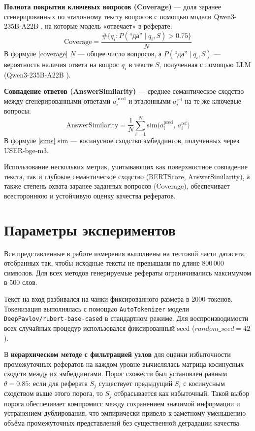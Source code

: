 \documentclass{article}
\begin{document}
\textbf{Полнота покрытия ключевых вопросов (Coverage)} — доля заранее сгенерированных по эталонному тексту вопросов с помощью модели Qwen3-\allowbreak 235B-\allowbreak A22B \cite{qwen3},
на которые модель «отвечает» в реферате:
\begin{equation}\label{coverage}
  \text{Coverage} = \frac{\#\{q_i\colon P(\text{“да”}\mid q_i,S)\!>\!0.75\}}{N}
\end{equation}
В формуле \eqref{coverage} $N$ — общее число вопросов, а $P(\text{“да”}\mid q_i,S)$ — вероятность наличия ответа на вопрос $q_i$ в тексте $S$, 
полученная с помощью LLM (Qwen3-\allowbreak 235B-\allowbreak A22B \cite{qwen3}).

\textbf{Совпадение ответов (AnswerSimilarity)} — среднее семантическое сходство между сгенерированными ответами $a_i^{\text{pred}}$ и эталонными $a_i^{\text{ref}}$ на те же ключевые вопросы:
\begin{equation}\label{sims}
  \text{AnswerSimilarity} = \frac{1}{N}\sum_{i=1}^N \mathrm{sim}\bigl(a_i^{\text{pred}},\,a_i^{\text{ref}}\bigr)
\end{equation}
В формуле \eqref{sims} $\mathrm{sim}$ — косинусное сходство эмбеддингов, полученных через USER‑bge‑m3.


Использование нескольких метрик, учитывающих как поверхностное совпадение текста, так и глубокое семантическое сходство (BERTScore, AnswerSimilarity), 
а также степень охвата заранее заданных вопросов (Coverage), обеспечивает всестороннюю и устойчивую оценку качества рефератов.

\section*{Параметры экспериментов}

Все представленные в работе измерения выполнены на тестовой части датасета, 
отобранных так, чтобы исходные тексты не превышали по длине 800\,000 символов. 
Для всех методов генерируемые рефераты ограничивались максимумом в 500 слов.

Текст на вход разбивался на чанки фиксированного размера в 2000 токенов. 
Токенизация выполнялась с помощью \texttt{AutoTokenizer} модели \texttt{DeepPavlov/rubert-base-cased} в стандартном режиме.
Для воспроизводимости всех случайных процедур использовался фиксированный seed ($random\_seed = 42$).

В \textbf{иерархическом методе с фильтрацией узлов} для оценки избыточности промежуточных рефератов на каждом уровне вычислялась матрица косинусных сходств между их эмбеддингами.
Порог схожести был установлен равным $\theta=0.85$: если для реферата $S_j$ существует предыдущий $S_i$ с косинусным сходством выше этого порога, 
то $S_j$ отбрасывается как избыточный. Такой выбор порога обеспечивает компромисс между сохранением значимой информации и устранением дублирования, 
что эмпирически привело к заметному уменьшению объёма промежуточных представлений без существенной деградации качества.
\end{document}
